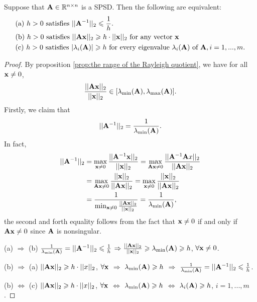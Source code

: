 \begin{proposition}{}{}
    Suppose that $\bold{A}\in\mathbb{R}^{n\times n}$ is a SPSD. Then the following are equivalent:
    \begin{align*}
        &\text{(a) } h>0 \text{ satisfies } ||\bold{A}^{-1}||_2\leqslant \frac{1}{h}.\\
        &\text{(b) } h>0 \text{ satisfies } ||\bold{A}\bold{x}||_2 \geqslant h\cdot ||\bold{x}||_2 \text{ for any vector } \bold{x}\\
        &\text{(c) } h>0 \text{ satisfies } |\lambda_i(\bold{A})|\geqslant h \text{ for every eigenvalue } \lambda_i(\bold{A}) \text{ of } \bold{A}, i=1,...,m.
    \end{align*}
\end{proposition}
\begin{proof}
    By proposition \ref{prop:the range of the Rayleigh quotient}, 
    we have for all $\bold{x}\neq 0$,
    \begin{align*}
        \frac{||\bold{Ax}||_2}{||\bold{x}||_2}\in [\lambda_{\min}(\bold{A}),\lambda_{\max}(\bold{A})].
    \end{align*}
    Firstly, we claim that 
    \begin{align*}
        ||\bold{A}^{-1}||_2 =  \frac{1}{\lambda_{\min}(\bold{A})}.
    \end{align*}
    In fact, 
    \begin{align*}
        ||\bold{A}^{-1}||_2 &=  \max_{\bold{x}\neq 0} \frac{||\bold{A}^{-1}\bold{x}||_2}{||\bold{x}||_2}
        =\max_{\bold{Ax}\neq 0} \frac{||\bold{A}^{-1}\bold{A}x||_2}{||\bold{Ax}||_2} \\
        &=\max_{\bold{Ax}\neq 0} \frac{||\bold{x}||_2}{||\bold{Ax}||_2}
        = \max_{\bold{x}\neq 0} \frac{||\bold{x}||_2}{||\bold{Ax}||_2}\\
        &=\frac{1}{\min_{\bold{x}\neq 0} \frac{||\bold{Ax}||_2}{||\bold{x}||_2}}
        =\frac{1}{\lambda_{\min}(\bold{A})},
    \end{align*}
    the second and forth equality follows from the fact that $\bold{x}\neq 0$
    if and only if $\bold{Ax}\neq 0$ since $\bold{A}$ is nonsingular. 
    \par
    (a) $\Rightarrow$ (b) \quad $\frac{1}{\lambda_{\min}(\bold{A})}=||\bold{A}^{-1}||_2\leqslant \frac{1}{h}$
    $\Rightarrow \frac{||\bold{Ax}||_2}{||\bold{x}||_2}\geqslant \lambda_{\min}(\bold{A})\geqslant h$, $\forall \bold{x}\neq 0$.
    \par
    (b) $\Rightarrow$ (a) \quad $||\bold{Ax}||_2\geqslant h\cdot ||x||_2$, $\forall \bold{x}$ $\Rightarrow$ $\lambda_{\min}(\bold{A})\geqslant h$
    $\Rightarrow$ $\frac{1}{\lambda_{\min}(\bold{A})} = ||\bold{A}^{-1}||_2\leqslant \frac{1}{h}$.
    \par
    (b) $\Leftrightarrow$ (c) \quad $||\bold{Ax}||_2\geqslant h\cdot ||x||_2$, $\forall \bold{x}$ $\Leftrightarrow$ $\lambda_{\min}(\bold{A})\geqslant h$
    $\Leftrightarrow$ $\lambda_i(\bold{A})\geqslant h$, $i=1,...,m$.
    \par
\end{proof}



